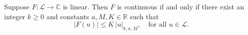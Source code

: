 Suppose $F: \mathcal{L} \to \mathbb{C}$ is linear. Then $F$ is continuous if and only if there exist an integer $k \geq 0$ and constants $a, M, K \in \mathbb{R}$ such that
$$|F(u)| \leq K \, |u|_{k,a,M}, \quad \text{for all } u \in \mathcal{L}.$$
